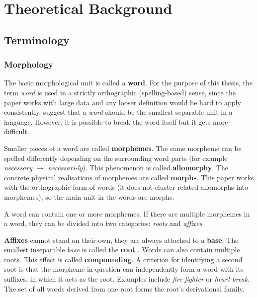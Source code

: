 ﻿\chapter{Theoretical Background}

\section{Terminology}

\subsection{Morphology}

The basic morphological unit is called a \textbf{word}. For the purpose of this thesis, the term \textit{word} is used in a strictly orthographic (spelling-based) sense, since the paper works with large data and any looser definition would be hard to apply consistently. \textcite{AndersonEtAl2022} suggest that a \textit{word} should be the smallest separable unit in a language. However, it is possible to break the word itself but it gets more difficult.

Smaller pieces of a word are called \textbf{morphemes}. The same morpheme can be spelled differently depending on the surrounding word parts (for example \textit{necessary} $\rightarrow$ \textit{necessari-ly}). This phenomenon is called \textbf{allomorphy}. The concrete physical realisations of morphemes are called \textbf{morphs}. This paper works with the orthographic form of words (it does not cluster related allomorphs into morphemes), so the main unit in the words are morphs.

A word can contain one or more morphemes. If there are multiple morphemes in a word, they can be divided into two categories: \textit{roots} and \textit{affixes}.

\textbf{Affixes} cannot stand on their own, they are always attached to a \textbf{base}. The smallest inseparable \textit{base} is called the \textbf{root} \parencite{AndersonEtAl2022}. Words can also contain multiple roots. This effect is called \textbf{compounding}. A criterion for identifying a second root is that the morpheme in question can independently form a word with its suffixes, in which it acts as the root. Examples include \textit{fire-fighter} or \textit{heart-break}. The set of all words derived from one root forms the root's derivational family.

